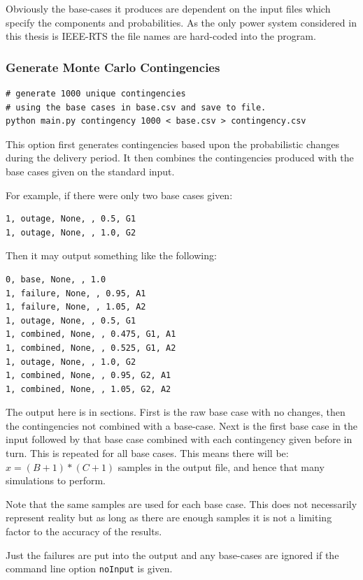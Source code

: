 \documentclass[a4paper,oneside,12pt]{report}
\begin{document}
Obviously the base-cases it produces are dependent on the input files which specify the components and probabilities. As the only power system considered in this thesis is IEEE-RTS the file names are hard-coded into the program.


\subsubsection{Generate Monte Carlo Contingencies}

\begin{verbatim}
# generate 1000 unique contingencies
# using the base cases in base.csv and save to file.
python main.py contingency 1000 < base.csv > contingency.csv
\end{verbatim}

This option first generates contingencies based upon the probabilistic changes during the delivery period. It then combines the contingencies produced with the base cases given on the standard input.

For example, if there were only two base cases given:

\begin{verbatim}
1, outage, None, , 0.5, G1
1, outage, None, , 1.0, G2
\end{verbatim}

Then it may output something like the following:

\begin{verbatim}
0, base, None, , 1.0
1, failure, None, , 0.95, A1
1, failure, None, , 1.05, A2
1, outage, None, , 0.5, G1
1, combined, None, , 0.475, G1, A1
1, combined, None, , 0.525, G1, A2
1, outage, None, , 1.0, G2
1, combined, None, , 0.95, G2, A1
1, combined, None, , 1.05, G2, A2
\end{verbatim}

The output here is in sections. First is the raw base case with no changes, then the contingencies not combined with a base-case. Next is the first base case in the input followed by that base case combined with each contingency given before in turn. This is repeated for all base cases. This means there will be: $ x = (B+1)*(C+1) $ samples in the output file, and hence that many simulations to perform.

Note that the same samples are used for each base case. This does not necessarily represent reality but as long as there are enough samples it is not a limiting factor to the accuracy of the results.

Just the failures are put into the output and any base-cases are ignored if the command line option \texttt{noInput} is given.
\end{document}
